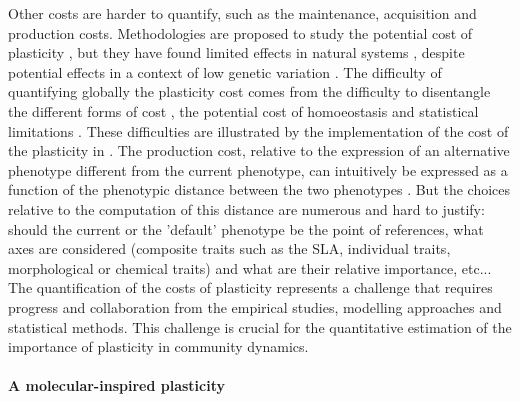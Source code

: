  Other costs are harder to quantify, such as the maintenance, acquisition and production costs. Methodologies are proposed to study the potential cost of plasticity \parencite{dewitt_costs_1998, valladares_quantitative_2006}, but they have found limited effects in natural systems \parencite{van_kleunen_constraints_2005}, despite potential effects in a context of low genetic variation \parencite{dechaine_constraints_2007}. The difficulty of quantifying globally the plasticity cost comes from the difficulty to disentangle the different forms of cost \parencite{murren_constraints_2015}, the potential cost of homoeostasis \parencite{van_kleunen_progress_2007}  and statistical limitations \parencite{auld_measuring_2011}. These difficulties are illustrated by the implementation of the cost of the plasticity in \model. The production cost, relative to the expression of an alternative phenotype different from the current phenotype, can intuitively be expressed as a function of the phenotypic distance between the two phenotypes \parencite{valladares_quantitative_2006}. But the choices relative to the computation of this distance are numerous and hard to justify: should the current or the 'default' phenotype be the point of references, what axes are considered (composite traits such as the  SLA, individual traits, morphological or chemical traits) and what are their relative importance, etc...
The quantification of the costs of plasticity represents a challenge that requires progress and collaboration from the empirical studies, modelling approaches and statistical methods. This challenge is crucial for the quantitative estimation of the importance of plasticity in community dynamics.
%
%
%
%
%

\paragraph{A molecular-inspired plasticity}

